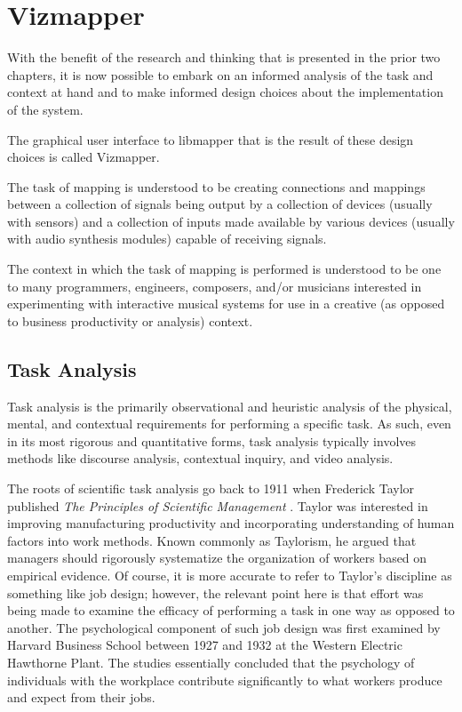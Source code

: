 \resetdatestamp

\chapter{Vizmapper}

With the benefit of the research and thinking that is presented in the prior two chapters, it is now possible to embark on an informed analysis of the task and context at hand and to make informed design choices about the implementation of the system.

The graphical user interface to libmapper that is the result of these design choices is called Vizmapper.

The task of mapping is understood to be creating connections and mappings between a collection of signals being output by a collection of devices (usually with sensors) and a collection of inputs made available by various devices (usually with audio synthesis modules)  capable of receiving signals.

The context in which the task of mapping is performed is understood to be one to many programmers, engineers, composers, and/or musicians interested in experimenting with interactive musical systems for use in a creative (as opposed to business productivity or analysis) context.

\section{Task Analysis}

Task analysis is the primarily observational and heuristic analysis of the physical, mental, and contextual requirements for performing a specific task. As such, even in its most rigorous and quantitative forms, task analysis typically involves methods like discourse analysis, contextual inquiry, and video analysis. 
\begin{comment}
Task analysis and human-computer interaction: approaches, techniques, and levels of analysis - Abe Crystal, Beth Ellington
\end{comment}

The roots of scientific task analysis go back to 1911 when Frederick Taylor published \emph{The Principles of Scientific Management} \cite{crystal2004}. Taylor was interested in improving manufacturing productivity and incorporating understanding of human factors into work methods. Known commonly as Taylorism, he argued that managers should rigorously systematize the organization of workers based on empirical evidence. Of course, it is more accurate to refer to Taylor's discipline as something like job design; however, the relevant point here is that effort was being made to examine the efficacy of performing a task in one way as opposed to another. The psychological component of such job design was first examined by Harvard Business School between 1927 and 1932 at the Western Electric Hawthorne Plant. The studies essentially concluded that the psychology of individuals with the workplace contribute significantly to what workers produce and expect from their jobs.

